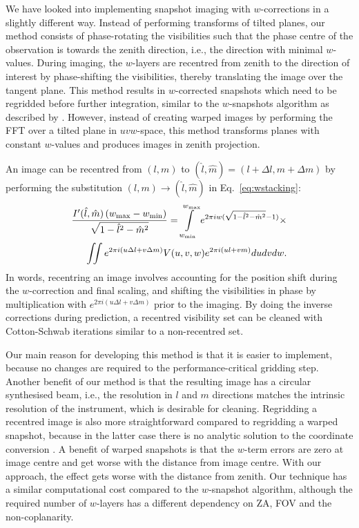 \documentclass[useAMS,usenatbib]{mn2e}
\begin{document}
We have looked into implementing snapshot imaging with $w$-corrections in a slightly different way. Instead of performing transforms of tilted planes, our method consists of phase-rotating the visibilities such that the phase centre of the observation is towards the zenith direction, i.e., the direction with minimal $w$-values. During imaging, the $w$-layers are recentred from zenith to the direction of interest by phase-shifting the visibilities, thereby translating the image over the tangent plane. This method results in $w$-corrected snapshots which need to be regridded before further integration, similar to the $w$-snapshots algorithm as described by \citet{widefield-imaging-ska-cornwell}. However, instead of creating warped images by performing the FFT over a tilted plane in $uvw$-space, this method transforms planes with constant $w$-values and produces images in zenith projection.

An image can be recentred from $(l,m)$ to $(\hat{l},\hat{m})=(l+\Delta l,m+\Delta m)$ by performing the substitution $(l,m)\rightarrow(\hat{l},\hat{m})$ in Eq.~\eqref{eq:wstacking}:
\begin{align}\notag
\frac{I'(\hat{l}, \hat{m})\left(w_{\max} - w_{\min}\right)}{\sqrt{1-\hat{l}^2-\hat{m}^2}} = \int\limits_{w_{\min}}^{w_{\max}} e^{2\pi i w(\sqrt{1-\hat{l}^2-\hat{m}^2}-1)} \times \\
\iint e^{2 \pi i \left(u\Delta l + v\Delta m\right)} V(u,v,w) e^{2\pi i \left(ul + vm\right)} du dv dw.
\end{align}
In words, recentring an image involves accounting for the position shift during the $w$-correction and final scaling, and shifting the visibilities in phase by multiplication with $e^{2 \pi i \left(u\Delta l + v\Delta m\right)}$ prior to the imaging. By doing the inverse corrections during prediction, a recentred visibility set can be cleaned with Cotton-Schwab iterations similar to a non-recentred set.

Our main reason for developing this method is that it is easier to implement, because no changes are required to the performance-critical gridding step. Another benefit of our method is that the resulting image has a circular synthesised beam, i.e., the resolution in $l$ and $m$ directions matches the intrinsic resolution of the instrument, which is desirable for cleaning. Regridding a recentred image is also more straightforward compared to regridding a warped snapshot, because in the latter case there is no analytic solution to the coordinate conversion \citep{perley-noncoplanar-arrays}. A benefit of warped snapshots is that the $w$-term errors are zero at image centre and get worse with the distance from image centre. With our approach, the effect gets worse with the distance from zenith. Our technique has a similar computational cost compared to the $w$-snapshot algorithm, although the required number of $w$-layers has a different dependency on ZA, FOV and the non-coplanarity.
\end{document}
